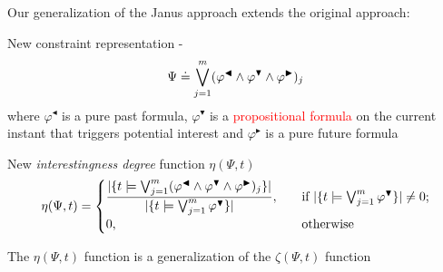 \documentclass[10pt]{beamer}
\begin{document}
\begin{frame}
\fontsize{10}{9.2}\selectfont
Our generalization of the Janus approach extends the original approach:
\begin{block}{New constraint representation - \rcon\xspace}
\[\Psi \doteq \bigvee^{m}_{j=1} (\varphi^{\blacktriangleleft} \wedge \varphi^{\blacktriangledown} \wedge \varphi^{\blacktriangleright})_j\]
where $\varphi^{\blacktriangleleft}$ is a pure past formula, $\varphi^{\blacktriangledown}$ is a \textcolor{red}{propositional formula} on the current instant that triggers potential interest and $\varphi^{\blacktriangleright}$ is a pure future formula
\end{block}

\begin{block}{New \emph{interestingness degree} function $\eta(\Psi, t)$}
\[   
\eta(\Psi,t) = 
     \begin{cases}
       \dfrac{\lvert \{t \models \bigvee^{m}_{j=1} (\varphi^{\blacktriangleleft} \wedge \varphi^{\blacktriangledown} \wedge \varphi^{\blacktriangleright})_j\} \rvert}{\lvert \{t \models \bigvee^{m}_{j=1} \varphi^{\blacktriangledown}\} \rvert}, &\quad\text{if } \lvert \{t \models \bigvee^{m}_{j=1} \varphi^{\blacktriangledown}\} \rvert \neq 0 ;\\
       0, &\quad\text{otherwise} \\
     \end{cases}
\]
\end{block}

\begin{theorem}
The $\eta(\Psi, t)$ function is a generalization of the $\zeta(\Psi, t)$ function
\end{theorem}

\end{frame}
\end{document}
